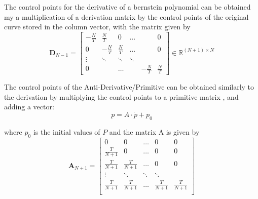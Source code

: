 \par The control points for the derivative of a bernstein polynomial can be obtained my a multiplication of a derivation matrix by the control points of the original curve stored in the column vector, with the matrix given by 
\begin{equation}
    \boldsymbol{D}_{N-1} = 
    \begin{bmatrix}
        -\frac{N}{T} & \frac{N}{T} & 0 & \ldots & & 0 \\
        0 & -\frac{N}{T} & \frac{N}{T} & \ldots & & 0 \\
        \vdots &  \ddots & \ddots & \ddots & &   \\
        0 & & \ldots & & -\frac{N}{T} & \frac{N}{T}
    \end{bmatrix} \in \mathbb{R}^{(N+1)\times N}
    \label{eq:bernderivmat}
\end{equation}

\par The control points of the Anti-Derivative/Primitive can be obtained similarly to the derivation by multiplying the control points to a primitive matrix \cite{privateconversationprimitive}, and adding a vector:
\begin{equation}
    p = A \cdot \dot{p}  + p_0
\end{equation}

where $p_0$ is the initial values of $P$ and the matrix A is given by 
\begin{equation}
    \boldsymbol{A}_{N+1} = \begin{bmatrix}
        0 & 0 & \ldots & 0 & 0 \\
        \frac{T}{N+1} & 0 & \ldots & 0 & 0 \\
        \frac{T}{N+1} & \frac{T}{N+1} & \ldots & 0 & 0 \\
        \vdots & \ddots & \ddots & \ddots & \\
        \frac{T}{N+1} & \frac{T}{N+1} & \ldots & \frac{T}{N+1} & \frac{T}{N+1} \\
    \end{bmatrix}
\end{equation}

